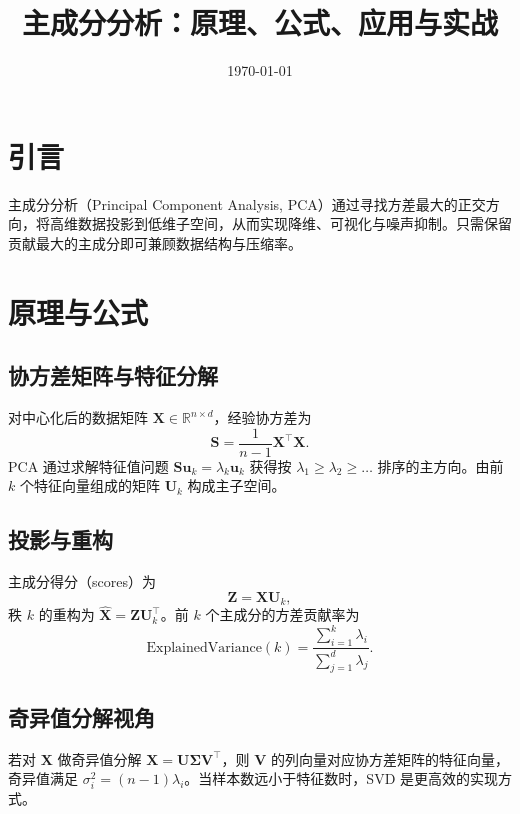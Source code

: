 \documentclass[UTF8,zihao=-4]{ctexart}
\title{主成分分析：原理、公式、应用与实战}
\author{}
\date{\today}
\begin{document}
\maketitle

\section{引言}
主成分分析（Principal Component Analysis, PCA）通过寻找方差最大的正交方向，将高维数据投影到低维子空间，从而实现降维、可视化与噪声抑制。只需保留贡献最大的主成分即可兼顾数据结构与压缩率。

\section{原理与公式}
\subsection{协方差矩阵与特征分解}
对中心化后的数据矩阵 \(\mathbf{X} \in \mathbb{R}^{n \times d}\)，经验协方差为
\begin{equation}
\mathbf{S} = \frac{1}{n-1} \mathbf{X}^\top \mathbf{X}.
\end{equation}
PCA 通过求解特征值问题 \(\mathbf{S}\mathbf{u}_k = \lambda_k \mathbf{u}_k\) 获得按 \(\lambda_1 \ge \lambda_2 \ge \dots\) 排序的主方向。由前 \(k\) 个特征向量组成的矩阵 \(\mathbf{U}_k\) 构成主子空间。

\subsection{投影与重构}
主成分得分（scores）为
\begin{equation}
\mathbf{Z} = \mathbf{X} \mathbf{U}_k,
\end{equation}
秩 \(k\) 的重构为 \(\hat{\mathbf{X}} = \mathbf{Z}\mathbf{U}_k^\top\)。前 \(k\) 个主成分的方差贡献率为
\begin{equation}
\text{ExplainedVariance}(k) = \frac{\sum_{i=1}^k \lambda_i}{\sum_{j=1}^d \lambda_j}.
\end{equation}

\subsection{奇异值分解视角}
若对 \(\mathbf{X}\) 做奇异值分解 \(\mathbf{X} = \mathbf{U}\mathbf{\Sigma}\mathbf{V}^\top\)，则 \(\mathbf{V}\) 的列向量对应协方差矩阵的特征向量，奇异值满足 \(\sigma_i^2 = (n-1)\lambda_i\)。当样本数远小于特征数时，SVD 是更高效的实现方式。
\end{document}
